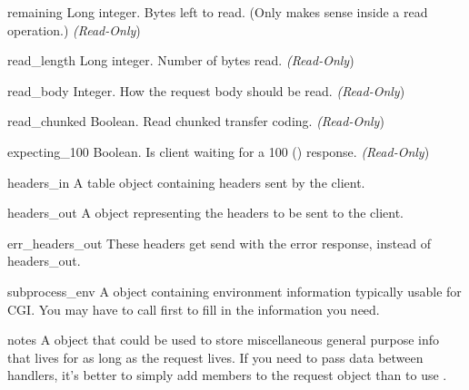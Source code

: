\begin{memberdesc}[request]{remaining}
  Long integer. Bytes left to read. (Only makes sense inside a read
  operation.)
  \emph{(Read-Only})
\end{memberdesc}

\begin{memberdesc}[request]{read_length}
  Long integer. Number of bytes read.
  \emph{(Read-Only})
\end{memberdesc}

\begin{memberdesc}[request]{read_body}
  Integer. How the request body should be read.
  \emph{(Read-Only})
\end{memberdesc}

\begin{memberdesc}[request]{read_chunked}
  Boolean. Read chunked transfer coding.
  \emph{(Read-Only})
\end{memberdesc}

\begin{memberdesc}[request]{expecting_100}
  Boolean. Is client waiting for a 100 () response.
  \emph{(Read-Only})
\end{memberdesc}

\begin{memberdesc}[request]{headers_in}
  A table object containing headers sent by the client.
\end{memberdesc}

\begin{memberdesc}[request]{headers_out}
  A  object representing the headers to be sent to the
  client. 
\end{memberdesc}

\begin{memberdesc}[request]{err_headers_out}
  These headers get send with the error response, instead of
  headers_out.
\end{memberdesc}

\begin{memberdesc}[request]{subprocess_env}
  A  object containing environment information typically usable for CGI.
  You may have to call  first to fill in the information
  you need.
\end{memberdesc}

\begin{memberdesc}[request]{notes}
  A  object that could be used to store miscellaneous
  general purpose info that lives for as long as the request lives. If
  you need to pass data between handlers, it's better to simply add
  members to the request object than to use .
\end{memberdesc}

